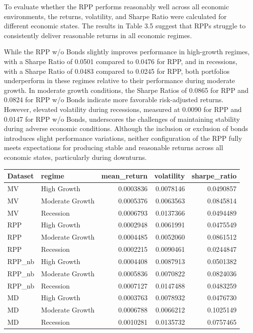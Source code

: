 \documentclass[11pt,preprint]{elsarticle}
\let\origtable\table
\let\endorigtable\endtable
\renewenvironment{table}[1][2] {
    \expandafter\origtable\expandafter[H]
} {
    \endorigtable
}
\numberwithin{equation}{section}
\numberwithin{figure}{section}
\numberwithin{table}{section}
\begin{document}
To evaluate whether the RPP performs reasonably well across all economic
environments, the returns, volatility, and Sharpe Ratio were calculated
for different economic states. The results in Table 3.5 suggest that
RPPs struggle to consistently deliver reasonable returns in all economic
regimes.

While the RPP w/o Bonds slightly improves performance in high-growth
regimes, with a Sharpe Ratio of 0.0501 compared to 0.0476 for RPP, and
in recessions, with a Sharpe Ratio of 0.0483 compared to 0.0245 for RPP,
both portfolios underperform in these regimes relative to their
performance during moderate growth. In moderate growth conditions, the
Sharpe Ratios of 0.0865 for RPP and 0.0824 for RPP w/o Bonds indicate
more favorable risk-adjusted returns. However, elevated volatility
during recessions, measured at 0.0090 for RPP and 0.0147 for RPP w/o
Bonds, underscores the challenges of maintaining stability during
adverse economic conditions. Although the inclusion or exclusion of
bonds introduces slight performance variations, neither configuration of
the RPP fully meets expectations for producing stable and reasonable
returns across all economic states, particularly during downturns.

\begin{table}
\centering
\caption{\label{tab:regime}Performance at Different Economic States}
\centering
\begin{tabular}[t]{l|l|r|r|r}
\hline
Dataset & regime & mean\_return & volatility & sharpe\_ratio\\
\hline
MV & High Growth & 0.0003836 & 0.0078146 & 0.0490857\\
\hline
MV & Moderate Growth & 0.0005376 & 0.0063563 & 0.0845814\\
\hline
MV & Recession & 0.0006793 & 0.0137366 & 0.0494489\\
\hline
RPP & High Growth & 0.0002948 & 0.0061991 & 0.0475549\\
\hline
RPP & Moderate Growth & 0.0004485 & 0.0052060 & 0.0861512\\
\hline
RPP & Recession & 0.0002215 & 0.0090461 & 0.0244847\\
\hline
RPP\_nb & High Growth & 0.0004408 & 0.0087913 & 0.0501382\\
\hline
RPP\_nb & Moderate Growth & 0.0005836 & 0.0070822 & 0.0824036\\
\hline
RPP\_nb & Recession & 0.0007127 & 0.0147488 & 0.0483259\\
\hline
MD & High Growth & 0.0003763 & 0.0078932 & 0.0476730\\
\hline
MD & Moderate Growth & 0.0006788 & 0.0066212 & 0.1025149\\
\hline
MD & Recession & 0.0010281 & 0.0135732 & 0.0757465\\
\hline
\end{tabular}
\end{table}
\end{document}
